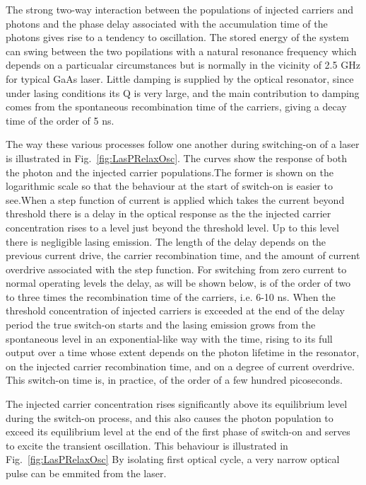 The strong two-way interaction between the populations of injected
carriers and photons and the phase delay associated with the
accumulation time of the photons gives rise to a tendency to
oscillation. The stored energy of the system can swing between the two
popilations with a natural resonance frequency which depends on a
particualar circumstances but is normally in the vicinity of 2.5 GHz
for typical GaAs laser. Little damping is supplied by the optical
resonator, since under lasing conditions its Q is very large, and the
main contribution to damping comes from the spontaneous recombination
time of the carriers, giving a decay time of the order of 5 ns.

The way these various processes follow one another during switching-on
of a laser is illustrated in Fig.~\ref{fig:LasPRelaxOsc}. The curves
show the response of both the photon and the injected carrier
populations.The former is shown on the logarithmic scale so that the
behaviour at the start of switch-on is easier to see.When a step
function of current is applied which takes the current beyond
threshold there is a delay in the optical response as the the injected
carrier concentration rises to a level just beyond the threshold
level. Up to this level there is negligible lasing emission. The
length of the delay depends on the previous current drive, the carrier
recombination time, and the amount of current overdrive associated
with the step function. For switching from zero current to normal
operating levels the delay, as will be shown below, is of the order of
two to three times the recombination time of the carriers, i.e. 6-10
ns. When the threshold concentration of injected carriers is exceeded
at the end of the delay period the true switch-on starts and the
lasing emission grows from the spontaneous level in an
exponential-like way with the time, rising to its full output over a
time whose extent depends on the photon lifetime in the resonator, on
the injected carrier recombination time, and on a degree of current
overdrive. This switch-on time is, in practice, of the order of a few
hundred picoseconds.

The injected carrier concentration rises significantly above its
equilibrium level during the switch-on process, and this also causes
the photon population to exceed its equilibrium level at the end of
the first phase of switch-on and serves to excite the transient
oscillation. This behaviour is illustrated in
Fig.~\ref{fig:LasPRelaxOsc} By isolating first optical cycle, a very
narrow optical pulse can be emmited from the laser.


